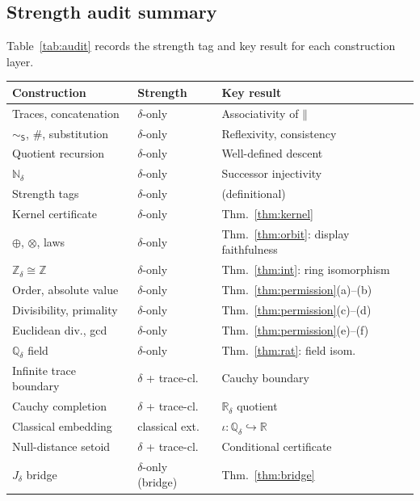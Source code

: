 \documentclass[11pt,a4paper]{article}
\theoremstyle{definition}
\theoremstyle{remark}
\begin{document}
\subsection{Strength audit summary}

Table~\ref{tab:audit} records the strength tag and key result for each
construction layer.

\begin{table}[ht]
\centering\small
\begin{tabular}{lll}
\toprule
\textbf{Construction} & \textbf{Strength} & \textbf{Key result} \\
\midrule
Traces, concatenation    & $\delta$-only & Associativity of $\mathbin{\|}$ \\
$\sim_{\mathsf{S}}$, $\mathbin{\#}$, substitution
                         & $\delta$-only & Reflexivity, consistency \\
Quotient recursion       & $\delta$-only & Well-defined descent \\
$\mathbb{N}_\delta$      & $\delta$-only & Successor injectivity \\
Strength tags            & $\delta$-only & (definitional) \\
Kernel certificate       & $\delta$-only & Thm.~\ref{thm:kernel} \\
$\oplus$, $\otimes$, laws & $\delta$-only & Thm.~\ref{thm:orbit}: display faithfulness \\
$\mathbb{Z}_\delta \cong \mathbb{Z}$
                         & $\delta$-only & Thm.~\ref{thm:int}: ring isomorphism \\
Order, absolute value    & $\delta$-only & Thm.~\ref{thm:permission}(a)--(b) \\
Divisibility, primality  & $\delta$-only & Thm.~\ref{thm:permission}(c)--(d) \\
Euclidean div., gcd      & $\delta$-only & Thm.~\ref{thm:permission}(e)--(f) \\
$\mathbb{Q}_\delta$ field & $\delta$-only & Thm.~\ref{thm:rat}: field isom. \\
Infinite trace boundary  & $\delta$ + trace-cl. & Cauchy boundary \\
Cauchy completion        & $\delta$ + trace-cl. & $\mathbb{R}_\delta$ quotient \\
Classical embedding      & classical ext. & $\iota : \mathbb{Q}_\delta
  \hookrightarrow \mathbb{R}$ \\
Null-distance setoid     & $\delta$ + trace-cl. & Conditional certificate \\
$J_\delta$ bridge        & $\delta$-only (bridge) & Thm.~\ref{thm:bridge} \\

\end{tabular}
\end{table}
\end{document}
